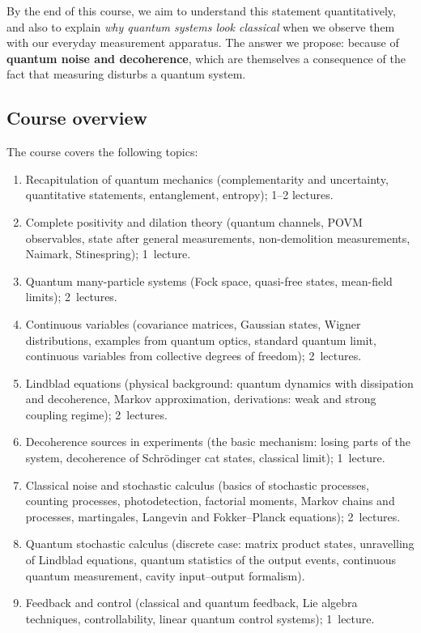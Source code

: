 By the end of this course, we aim to understand this statement
quantitatively, and also to explain \emph{why quantum systems look
classical} when we observe them with our everyday measurement
apparatus.  The answer we propose: because of \textbf{quantum noise and
decoherence}, which are themselves a consequence of the fact that
measuring disturbs a quantum system.

\subsection{Course overview}

The course covers the following topics:
\begin{enumerate}[(1)]
  \item Recapitulation of quantum mechanics (complementarity and
    uncertainty, quantitative statements, entanglement, entropy); 1--2
    lectures.
  \item Complete positivity and dilation theory (quantum channels, POVM
    observables, state after general measurements, non-demolition
    measurements, Naimark, Stinespring); 1~lecture.
  \item Quantum many-particle systems (Fock space, quasi-free states,
    mean-field limits); 2~lectures.
  \item Continuous variables (covariance matrices, Gaussian states,
    Wigner distributions, examples from quantum optics, standard
    quantum limit, continuous variables from collective degrees of
    freedom); 2~lectures.
  \item Lindblad equations (physical background: quantum dynamics with
    dissipation and decoherence, Markov approximation, derivations:
    weak and strong coupling regime); 2~lectures.
  \item Decoherence sources in experiments (the basic mechanism: losing
    parts of the system, decoherence of Schr\"odinger cat states,
    classical limit); 1~lecture.
  \item Classical noise and stochastic calculus (basics of stochastic
    processes, counting processes, photodetection, factorial moments,
    Markov chains and processes, martingales, Langevin and
    Fokker--Planck equations); 2~lectures.
  \item Quantum stochastic calculus (discrete case: matrix product
    states, unravelling of Lindblad equations, quantum statistics of
    the output events, continuous quantum measurement, cavity
    input--output formalism).
  \item Feedback and control (classical and quantum feedback, Lie
    algebra techniques, controllability, linear quantum control
    systems); 1~lecture.
\end{enumerate}

